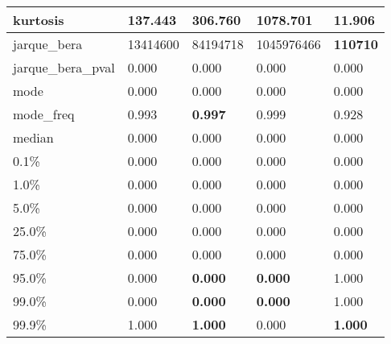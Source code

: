 \begin{table}[H]
\begin{tabular}{|l|m{10em}|m{10em}|m{10em}|m{10em}|}
\hline kurtosis & 137.443 & 306.760 & \cellcolor[rgb]{0.9, 0.54, 0.52} 1078.701 & \bfseries 11.906 \\
\hline jarque\_bera & 13414600 & 84194718 & \cellcolor[rgb]{0.9, 0.54, 0.52} 1045976466 & \bfseries 110710 \\
\hline jarque\_bera\_pval & 0.000 & 0.000 & 0.000 & 0.000 \\
\hline mode & 0.000 & 0.000 & 0.000 & 0.000 \\
\hline mode\_freq & 0.993 & \bfseries 0.997 & 0.999 & \cellcolor[rgb]{0.9, 0.54, 0.52} 0.928 \\
\hline median & 0.000 & 0.000 & 0.000 & 0.000 \\
\hline 0.1\% & 0.000 & 0.000 & 0.000 & 0.000 \\
\hline 1.0\% & 0.000 & 0.000 & 0.000 & 0.000 \\
\hline 5.0\% & 0.000 & 0.000 & 0.000 & 0.000 \\
\hline 25.0\% & 0.000 & 0.000 & 0.000 & 0.000 \\
\hline 75.0\% & 0.000 & 0.000 & 0.000 & 0.000 \\
\hline 95.0\% & 0.000 & \bfseries 0.000 & \bfseries 0.000 & \cellcolor[rgb]{0.9, 0.54, 0.52} 1.000 \\
\hline 99.0\% & 0.000 & \bfseries 0.000 & \bfseries 0.000 & \cellcolor[rgb]{0.9, 0.54, 0.52} 1.000 \\
\hline 99.9\% & 1.000 & \bfseries 1.000 & \cellcolor[rgb]{0.9, 0.54, 0.52} 0.000 & \bfseries 1.000 \\
\hline
\end{tabular}
\end{table}

